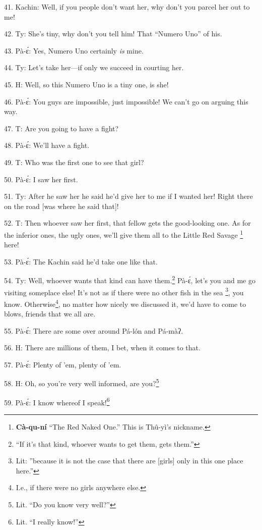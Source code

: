41. Kachin: Well, if you people don't want her, why don't you parcel her out to
me!

42. Ty: She's tiny, why don't you tell him! That ``Numero Uno'' of his.

43. Pà-ɛ́: Yes, Numero Uno certainly\textit{ is} mine.

44. Ty: Let's take her---if only we succeed in courting her.

45. H: Well, so this Numero Uno is a tiny one, is she!

46. Pà-ɛ́: You guys are impossible, just impossible! We can't go on arguing this
way.

47. T: Are you going to have a fight?

48. Pà-ɛ́: We'll have a fight.

49. T: Who was the first one to see that girl?

50. Pà-ɛ́: I saw her first.

51. Ty: After he saw her he said he'd give her to me if I wanted her! Right there
on the road [was where he said that]!

52. T: Then whoever saw her first, that fellow gets the good-looking one. As
for the inferior ones, the ugly ones, we'll give them all to the Little Red Savage
\footnote{\textbf{Cà-qu-ní} ``The Red Naked One.'' This is Thû-yì's nickname.} here!


53. Pà-ɛ́: The Kachin said he'd take one like that.

54. Ty: Well, whoever wants that kind can have them.\footnote{``If it's that kind, whoever wants to get them, gets them.''} Pà-ɛ́, let's you and
me go visiting someplace else! It's not as if there were no other fish in the sea
\footnote{Lit: ''because it is not the case that there are [girls] only in this one place here.''}, you know. Otherwise\footnote{I.e., if there were no girls anywhere else.}, no matter how nicely we discussed it, we'd have
to come to blows, friends that we all are.

55. Pà-ɛ́: There are some over around Pá-lón and Pá-màʔ.

56. H: There are millions of them, I bet, when it comes to that.

57. Pà-ɛ́: Plenty of 'em, plenty of 'em.

58. H: Oh, so you're very well informed, are you?\footnote{Lit. ``Do you know very well?''}

59. Pà-ɛ́: I know whereof I speak!\footnote{Lit. ``I really know!''}


